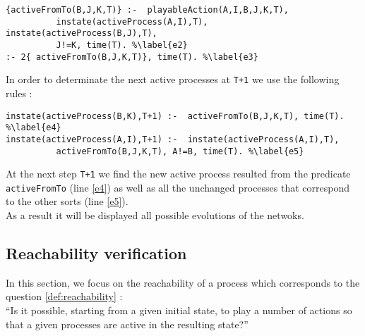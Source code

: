 \begin{lstlisting}
{activeFromTo(B,J,K,T)} :-  playableAction(A,I,B,J,K,T),
          instate(activeProcess(A,I),T), instate(activeProcess(B,J),T),
          J!=K, time(T). %\label{e2}
:- 2{ activeFromTo(B,J,K,T)}, time(T). %\label{e3}
\end{lstlisting}

In order to determinate the next active processes at \texttt{T+1} we use the following rules :
\begin{lstlisting}
instate(activeProcess(B,K),T+1) :-  activeFromTo(B,J,K,T), time(T). %\label{e4}
instate(activeProcess(A,I),T+1) :-  instate(activeProcess(A,I),T),
          activeFromTo(B,J,K,T), A!=B, time(T). %\label{e5}
\end{lstlisting}

At the next step \texttt{T+1} we find the new active process resulted from the predicate \texttt{activeFromTo} (line \ref{e4}) as well as all the unchanged processes that correspond to the other sorts (line \ref{e5}).\\
As a result it will be displayed all possible evolutions of the netwoks.
\subsection{Reachability verification}
In this section, we focus on the reachability of a process which corresponds to the question \ref{def:reachability} :\\
“Is it possible, starting from a given initial state, to play a number of actions so that a given processes are active in the resulting state?”

